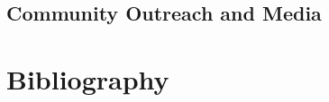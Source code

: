 \documentclass[runningheads,a4paper]{llncs}
\begin{document}
\subsection{Community Outreach and Media}




\section*{Bibliography}



%
\newpage

\end{document}
